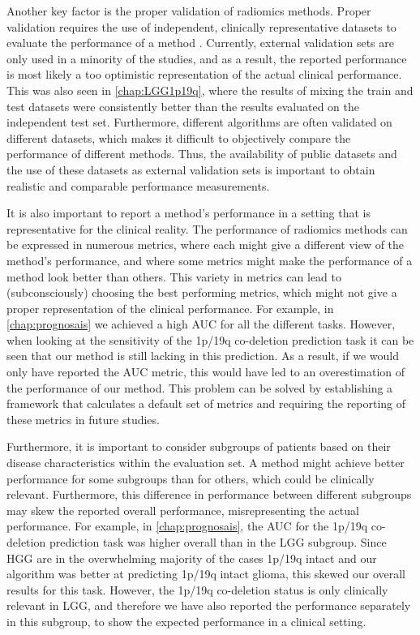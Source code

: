 Another key factor is the proper validation of radiomics methods.
Proper validation requires the use of independent, clinically representative datasets to evaluate the performance of a method \autocite{gillies2016radiomics, rizzo2018radiomics, lohmann2020radiomics, yip2016applications}.
Currently, external validation sets are only used in a minority of the studies, and as a result, the reported performance is most likely a too optimistic representation of the actual clinical performance.
This was also seen in \cref{chap:LGG1p19q}, where the results of mixing the train and test datasets were consistently better than the results evaluated on the independent test set.
Furthermore, different algorithms are often validated on different datasets, which makes it difficult to objectively compare the performance of different methods.
Thus, the availability of public datasets and the use of these datasets as external validation sets is important to obtain realistic and comparable performance measurements.

It is also important to report a method's performance in a setting that is representative for the clinical reality.
The performance of radiomics methods can be expressed in numerous metrics, where each might give a different view of the method's performance, and where some metrics might make the performance of a method look better than others.
This variety in metrics can lead to (subconsciously) choosing the best performing metrics, which might not give a proper representation of the clinical performance.
For example, in \cref{chap:prognosais} we achieved a high \gls{AUC} for all the different tasks.
However, when looking at the sensitivity of the 1p/19q co-deletion prediction task it can be seen that our method is still lacking in this prediction.
As a result, if we would only have reported the \gls{AUC} metric, this would have led to an overestimation of the performance of our method.
This problem can be solved by establishing a framework that calculates a default set of metrics and requiring the reporting of these metrics in future studies.


Furthermore, it is important to consider subgroups of patients based on their disease characteristics within the evaluation set.
A method might achieve better performance for some subgroups than for others, which could be clinically relevant.
Furthermore, this difference in performance between different subgroups may skew the reported overall performance, misrepresenting the actual performance.
For example, in \cref{chap:prognosais}, the \gls{AUC} for the 1p/19q co-deletion prediction task was higher overall than in the \gls{LGG} subgroup.
Since \gls{HGG} are in the overwhelming majority of the cases 1p/19q intact and our algorithm was better at predicting 1p/19q intact glioma, this skewed our overall results for this task.
However, the 1p/19q co-deletion status is only clinically relevant in \gls{LGG}, and therefore we have also reported the performance separately in this subgroup, to show the expected performance in a clinical setting.


